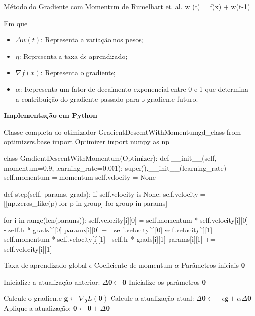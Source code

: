 \begin{equacaodestaque}{Método do Gradiente com Momentum de Rumelhart et. al.}
        \Delta w (t) = \eta \nabla f(x) + \alpha \Delta w(t-1)
    \label{eq:metodo-do-gradiente-com-momentum-da-retropropagacao}
\end{equacaodestaque}

Em que:

\begin{itemize}
    \item $\Delta w(t)$: Representa a variação nos pesos;
    \item $\eta$: Representa a taxa de aprendizado;
    \item $\nabla f(x)$: Representa o gradiente;
    \item $\alpha$: Representa um fator de decaimento exponencial entre 0 e 1 que determina a contribuição do gradiente passado para o gradiente futuro.
\end{itemize}

\textbf{Implementação em Python}

\begin{codelisting}{Classe completa do otimizador GradientDescentWithMomentum}{gd_class}
from optimizers.base import Optimizer
import numpy as np

class GradientDescentWithMomentum(Optimizer):
    def __init__(self, momentum=0.9, learning_rate=0.001):
        super().__init__(learning_rate)
        self.momentum = momentum
        self.velocity = None

    def step(self, params, grads):
        if self.velocity is None:
            self.velocity = [[np.zeros_like(p) for p in group] for group in params]

        for i in range(len(params)):
            self.velocity[i][0] = self.momentum * self.velocity[i][0] - self.lr * grads[i][0]
            params[i][0] += self.velocity[i][0]
            self.velocity[i][1] = self.momentum * self.velocity[i][1] - self.lr * grads[i][1]
            params[i][1] += self.velocity[i][1]
\end{codelisting}

\begin{algorithm}[H]
\caption{O Método do Gradiente com Momentum (versão de Rumelhart et al.)}
\label{alg:momentum_rumelhart}
\begin{algorithmic}[1]
\Require Taxa de aprendizado global $\epsilon$
\Require Coeficiente de momentum $\alpha$
\Require Parâmetros iniciais $\boldsymbol{\theta}$

\State Inicialize a atualização anterior: $\Delta\boldsymbol{\theta} \gets \mathbf{0}$
\State Inicialize os parâmetros $\boldsymbol{\theta}$

    \State Calcule o gradiente $\mathbf{g} \gets \nabla_{\boldsymbol{\theta}} L(\boldsymbol{\theta})$
    \State Calcule a atualização atual: $\Delta\boldsymbol{\theta} \gets -\epsilon \mathbf{g} + \alpha \Delta\boldsymbol{\theta}$
    \State Aplique a atualização: $\boldsymbol{\theta} \gets \boldsymbol{\theta} + \Delta\boldsymbol{\theta}$
\EndWhile
\end{algorithmic}
\end{algorithm}



